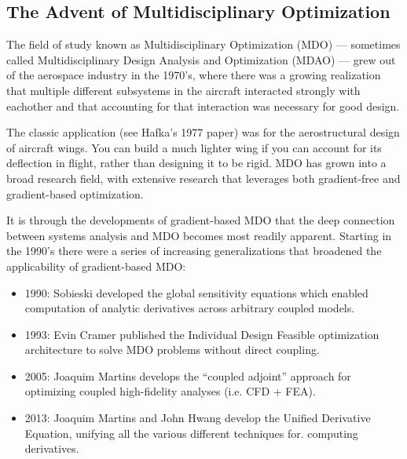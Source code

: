 \documentclass[conf]{new-aiaa}
\begin{document}
    \subsection{The Advent of Multidisciplinary Optimization}

    The field of study known as Multidisciplinary Optimization (MDO) --- sometimes called Multidisciplinary Design Analysis and Optimization (MDAO) --- grew out of the aerospace industry in the 1970's, 
    where there was a growing realization that multiple different subsystems in the aircraft interacted strongly with eachother and that accounting for that interaction was necessary for good design. 

    The classic application (see Hafka's 1977 paper) was for the aerostructural design of aircraft wings. 
    You can build a much lighter wing if you can account for its deflection in flight, rather than designing it to be rigid. 
    MDO has grown into a broad research field, with extensive research that leverages both gradient-free and gradient-based optimization. 

    It is through the developments of gradient-based MDO that the deep connection between systems analysis and MDO becomes most readily apparent. 
    Starting in the 1990's there were a series of increasing generalizations that broadened the applicability of gradient-based MDO: 

    \begin{itemize}[itemsep=1.2em, label={}, itemindent=-2.9em]
        \item 1990: Sobieski developed the global sensitivity equations which enabled computation of analytic derivatives across arbitrary coupled models.
        \item 1993: Evin Cramer published the Individual Design Feasible optimization architecture to solve MDO problems without direct coupling.
        \item 2005: Joaquim Martins develops the ``coupled adjoint'' approach for optimizing coupled high-fidelity analyses (i.e. CFD + FEA).
        \item 2013: Joaquim Martins and John Hwang develop the Unified Derivative Equation, unifying all the various different techniques for. computing derivatives.
    \end{itemize}


\end{document}
